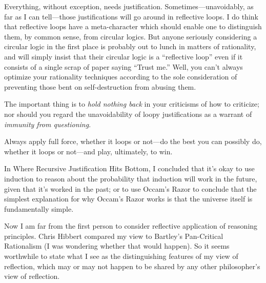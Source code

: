  Everything, without exception, needs justification.
Sometimes---unavoidably, as far as I can tell---those justifications
will go around in reflective loops. I do think that reflective loops
have a meta-character which should enable one to distinguish them, by
common sense, from circular logics. But anyone seriously considering a
circular logic in the first place is probably out to lunch in matters
of rationality, and will simply insist that their circular logic is a
``reflective loop'' even if it
consists of a single scrap of paper saying ``Trust
me.'' Well, you can't always optimize
your rationality techniques according to the sole consideration of
preventing those bent on self-destruction from abusing them.

{
 The important thing is to \textit{hold nothing back} in your
criticisms of how to criticize; nor should you regard the
unavoidability of loopy justifications as a warrant of \textit{immunity
from questioning}.}


 Always apply full force, whether it loops or not---do the best you
can possibly do, whether it loops or not---and play, ultimately, to
win.

\myendsectiontext



 In Where Recursive Justification Hits Bottom, I concluded that
it's okay to use induction to reason about the
probability that induction will work in the future, given that
it's worked in the past; or to use
Occam's Razor to conclude that the simplest explanation
for why Occam's Razor works is that the universe itself
is fundamentally simple. 


 Now I am far from the first person to consider reflective
application of reasoning principles. Chris Hibbert compared my view to
Bartley's Pan-Critical Rationalism (I was wondering
whether that would happen). So it seems worthwhile to state what I see
as the distinguishing features of my view of reflection, which may or
may not happen to be shared by any other philosopher's
view of reflection.

